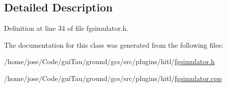 \subsection{Detailed Description}


Definition at line 34 of file fgsimulator.\-h.



The documentation for this class was generated from the following files\-:\begin{DoxyCompactItemize}
\item 
/home/jose/\-Code/gui\-Tau/ground/gcs/src/plugins/hitl/\hyperlink{fgsimulator_8h}{fgsimulator.\-h}\item 
/home/jose/\-Code/gui\-Tau/ground/gcs/src/plugins/hitl/\hyperlink{fgsimulator_8cpp}{fgsimulator.\-cpp}\end{DoxyCompactItemize}
